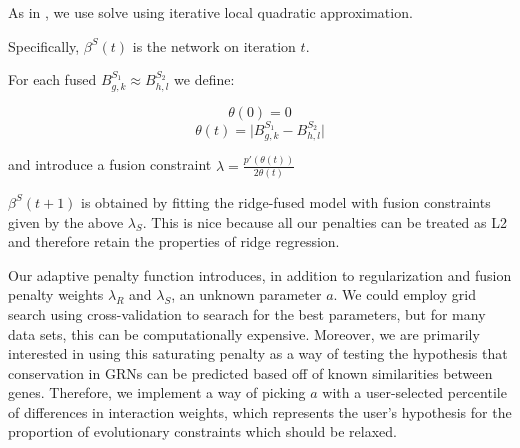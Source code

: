 \documentclass[11pt]{article}
\begin{document}



    
As in \cite{fan2001variable}, we use solve using iterative local quadratic approximation. 

Specifically, $\beta^S(t)$ is the network on iteration $t$. 

For each fused $B^{S_1}_{g,k} \approx B^{S_2}_{h,l}$ we define:

\begin{equation} 
\theta(0)=0
\end{equation}
\begin{equation}
\theta(t) = \vert B^{S_1}_{g,k} - B^{S_2}_{h,l} \vert
\end{equation}

and introduce a fusion constraint $\lambda = \frac{p'(\theta(t))}{2\theta(t)} $

$\beta^S(t+1)$ is obtained by fitting the ridge-fused model with fusion constraints given by the above $\lambda_S$. This is nice because all our penalties can be treated as L2 and therefore retain the properties of ridge regression. 

Our adaptive penalty function introduces, in addition to regularization and fusion penalty weights $\lambda_R$ and $\lambda_S$, an unknown parameter $a$. We could employ grid search using cross-validation to searach for the best parameters, but for many data sets, this can be computationally expensive. Moreover, we are primarily interested in using this saturating penalty as a way of testing the hypothesis that conservation in GRNs can be predicted based off of known similarities between genes. Therefore, we implement a way of picking $a$ with a user-selected percentile of differences in interaction weights, which represents the user's hypothesis for the proportion of evolutionary constraints which should be relaxed. 
\end{document}
